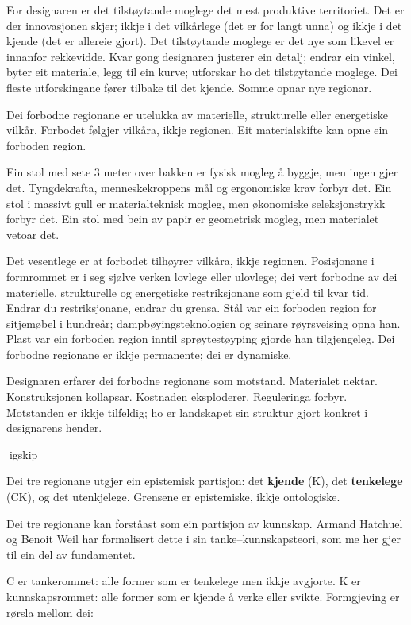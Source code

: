 For designaren er det tilstøytande moglege det mest produktive territoriet. Det er der innovasjonen skjer; ikkje i det vilkårlege (det er for langt unna) og ikkje i det kjende (det er allereie gjort). Det tilstøytande moglege er det nye som likevel er innanfor rekkevidde. Kvar gong designaren justerer ein detalj; endrar ein vinkel, byter eit materiale, legg til ein kurve; utforskar ho det tilstøytande moglege. Dei fleste utforskingane fører tilbake til det kjende. Somme opnar nye regionar.

Dei forbodne regionane er utelukka av materielle, strukturelle eller energetiske vilkår. Forbodet følgjer vilkåra, ikkje regionen. Eit materialskifte kan opne ein forboden region.

Ein stol med sete 3 meter over bakken er fysisk mogleg å byggje, men ingen gjer det. Tyngdekrafta, menneskekroppens mål og ergonomiske krav forbyr det. Ein stol i massivt gull er materialteknisk mogleg, men økonomiske seleksjonstrykk forbyr det. Ein stol med bein av papir er geometrisk mogleg, men materialet vetoar det.

Det vesentlege er at forbodet tilhøyrer vilkåra, ikkje regionen. Posisjonane i formrommet er i seg sjølve verken lovlege eller ulovlege; dei vert forbodne av dei materielle, strukturelle og energetiske restriksjonane som gjeld til kvar tid. Endrar du restriksjonane, endrar du grensa. Stål var ein forboden region for sitjemøbel i hundreår; dampbøyingsteknologien og seinare røyrsveising opna han. Plast var ein forboden region inntil sprøytestøyping gjorde han tilgjengeleg. Dei forbodne regionane er ikkje permanente; dei er dynamiske.

Designaren erfarer dei forbodne regionane som motstand. Materialet nektar. Konstruksjonen kollapsar. Kostnaden eksploderer. Reguleringa forbyr. Motstanden er ikkje tilfeldig; ho er landskapet sin struktur gjort konkret i designarens hender.

igskip

Dei tre regionane utgjer ein epistemisk partisjon: det \textbf{kjende} (K), det \textbf{tenkelege} (CK), og det utenkjelege. Grensene er epistemiske, ikkje ontologiske.

Dei tre regionane kan forståast som ein partisjon av kunnskap. Armand Hatchuel og Benoit Weil har formalisert dette i sin tanke--kunnskapsteori, som me her gjer til ein del av fundamentet.

C er tankerommet: alle former som er tenkelege men ikkje avgjorte. K er kunnskapsrommet: alle former som er kjende å verke eller svikte. Formgjeving er rørsla mellom dei:

